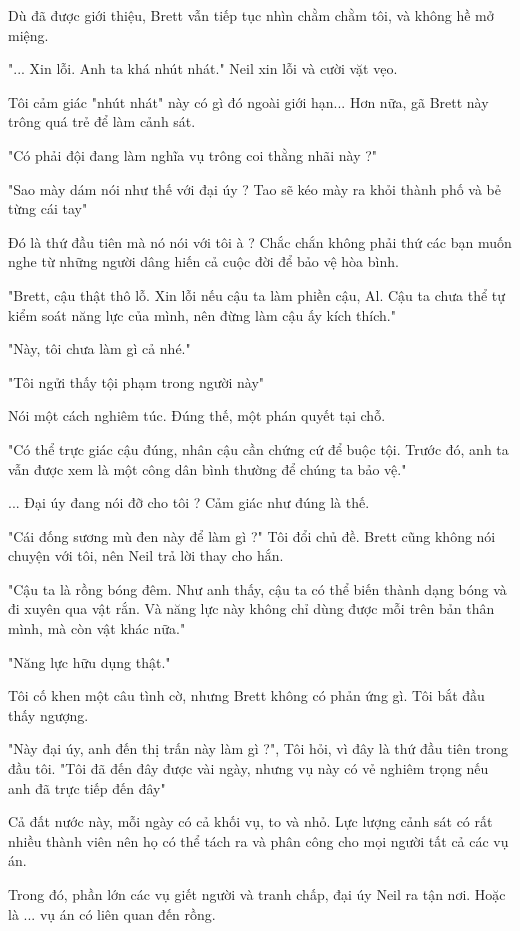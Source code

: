 Dù đã được giới thiệu, Brett vẫn tiếp tục nhìn chằm chằm tôi, và không hề mở miệng.

"... Xin lỗi. Anh ta khá nhút nhát." Neil xin lỗi và cười vặt vẹo.

Tôi cảm giác "nhút nhát" này có gì đó ngoài giới hạn... Hơn nữa, gã Brett này trông quá trẻ để làm cảnh sát.

"Có phải đội đang làm nghĩa vụ trông coi thằng nhãi này ?"

"Sao mày dám nói như thế với đại úy ? Tao sẽ kéo mày ra khỏi thành phố và bẻ từng cái tay"

Đó là thứ đầu tiên mà nó nói với tôi à ? Chắc chắn không phải thứ các bạn muốn nghe từ những người dâng hiến cả cuộc đời để bảo vệ hòa bình.

"Brett, cậu thật thô lỗ. Xin lỗi nếu cậu ta làm phiền cậu, Al. Cậu ta chưa thể tự kiểm soát năng lực của mình, nên đừng làm cậu ấy kích thích."

"Này, tôi chưa làm gì cả nhé."

"Tôi ngửi thấy tội phạm trong người này"

Nói một cách nghiêm túc. Đúng thế, một phán quyết tại chỗ.

"Có thể trực giác cậu đúng, nhân cậu cần chứng cứ để buộc tội. Trước đó, anh ta vẫn được xem là một công dân bình thường để chúng ta bảo vệ."

... Đại úy đang nói đỡ cho tôi ? Cảm giác như đúng là thế.

"Cái đống sương mù đen này để làm gì ?" Tôi đổi chủ đề. Brett cũng không nói chuyện với tôi, nên Neil trả lời thay cho hắn.

"Cậu ta là rồng bóng đêm. Như anh thấy, cậu ta có thể biến thành dạng bóng và đi xuyên qua vật rắn. Và năng lực này không chỉ dùng được mỗi trên bản thân mình, mà còn vật khác nữa."

"Năng lực hữu dụng thật."

Tôi cố khen một câu tình cờ, nhưng Brett không có phản ứng gì. Tôi bắt đầu thấy ngượng.

"Này đại úy, anh đến thị trấn này làm gì ?", Tôi hỏi, vì đây là thứ đầu tiên trong đầu tôi. "Tôi đã đến đây được vài ngày, nhưng vụ này có vẻ nghiêm trọng nếu anh đã trực tiếp đến đây"

Cả đất nước này, mỗi ngày có cả khối vụ, to và nhỏ. Lực lượng cảnh sát có rất nhiều thành viên nên họ có thể tách ra và phân công cho mọi người tất cả các vụ án.

Trong đó, phần lớn các vụ giết người và tranh chấp, đại úy Neil ra tận nơi. Hoặc là ... vụ án có liên quan đến rồng. 

